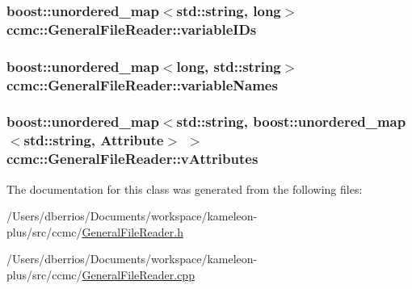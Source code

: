 \hypertarget{classccmc_1_1_general_file_reader_a70d799a29940fa982885ce8c0963942d}{
\subsubsection[{variable\-I\-Ds}]{\setlength{\rightskip}{0pt plus 5cm}boost\-::unordered\-\_\-map$<$std\-::string, long$>$ ccmc\-::\-General\-File\-Reader\-::variable\-I\-Ds\hspace{0.3cm}{\ttfamily [protected]}}}\label{classccmc_1_1_general_file_reader_a70d799a29940fa982885ce8c0963942d}
\hypertarget{classccmc_1_1_general_file_reader_aa3a4c9091feaec12035bcc981299de47}{
\subsubsection[{variable\-Names}]{\setlength{\rightskip}{0pt plus 5cm}boost\-::unordered\-\_\-map$<$long, std\-::string$>$ ccmc\-::\-General\-File\-Reader\-::variable\-Names\hspace{0.3cm}{\ttfamily [protected]}}}\label{classccmc_1_1_general_file_reader_aa3a4c9091feaec12035bcc981299de47}
\hypertarget{classccmc_1_1_general_file_reader_a806b25ba22db767f9f61ae578634ef08}{
\subsubsection[{v\-Attributes}]{\setlength{\rightskip}{0pt plus 5cm}boost\-::unordered\-\_\-map$<$std\-::string, boost\-::unordered\-\_\-map$<$std\-::string, {\bf Attribute}$>$ $>$ ccmc\-::\-General\-File\-Reader\-::v\-Attributes\hspace{0.3cm}{\ttfamily [protected]}}}\label{classccmc_1_1_general_file_reader_a806b25ba22db767f9f61ae578634ef08}


The documentation for this class was generated from the following files\-:\begin{DoxyCompactItemize}
\item 
/\-Users/dberrios/\-Documents/workspace/kameleon-\/plus/src/ccmc/\hyperlink{_general_file_reader_8h}{General\-File\-Reader.\-h}\item 
/\-Users/dberrios/\-Documents/workspace/kameleon-\/plus/src/ccmc/\hyperlink{_general_file_reader_8cpp}{General\-File\-Reader.\-cpp}\end{DoxyCompactItemize}
